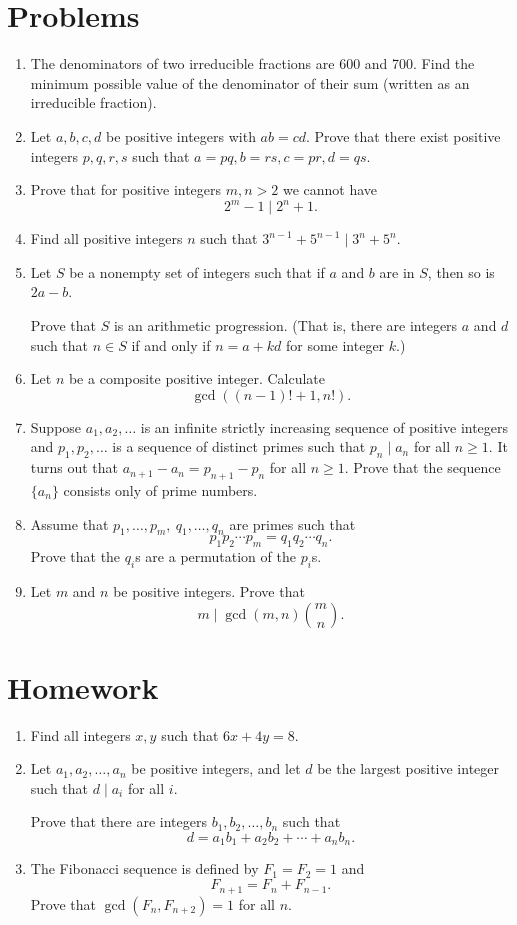 \documentclass{article}
\begin{document}
\section{Problems}
  \begin{enumerate}
    \item The denominators of two irreducible fractions are 600 and 700. Find the
      minimum possible value of the denominator of their sum (written as an irreducible
      fraction).
    \item Let $a,b,c,d$ be positive integers with $ab=cd$. Prove that there
      exist positive integers $p,q,r,s$ such that \(a=pq,b=rs,c=pr,d=qs\).
    \item Prove that for positive integers $m,n>2$ we cannot have \[2^m-1\mid
        2^n+1.\]
    \item Find all positive integers $n$ such that $3^{n-1}+5^{n-1}\mid
      3^n+5^n$.
    \item Let $S$ be a nonempty set of integers such that if $a$ and $b$ are in $S$, then
      so is $2a-b$.

      Prove that $S$ is an arithmetic
      progression. (That is, there are integers $a$ and $d$ such that $n\in S$ if
      and only if 
      $n=a+kd$ for some integer $k$.)
    \item Let $n$ be a composite positive integer. Calculate
      \[\gcd((n-1)!+1,n!).\]
    \item Suppose $a_1,a_2, \dots$ is an infinite strictly increasing sequence of
      positive integers and $p_1, p_2, \dots$ is a sequence of distinct primes
      such that $p_n \mid a_n$ for all $n \ge 1$. It turns out that
      $a_{n+1}-a_n=p_{n+1}-p_n$ for all $n\ge 1$. Prove that the sequence $\{a_n\}$
      consists only of prime numbers.
    \item Assume that $p_1,\ldots,p_m,\ q_1,\ldots,q_n$ are primes such that
      \[p_1p_2\cdots p_m=q_1q_2\cdots q_n.\]
      Prove that the $q_i$s are a permutation of the $p_i$s.
    \item Let $m$ and $n$ be positive integers. Prove that
      \[m\mid\gcd(m,n)\binom mn.\]
  \end{enumerate}
\newpage
\section{Homework}
  \begin{enumerate}
    \item Find all integers $x,y$ such that $6x+4y=8$.
    \item Let $a_1,a_2,\ldots,a_n$ be positive integers, and let $d$ be the
      largest positive integer such that $d\mid a_i$ for all $i$.

      Prove that there are integers $b_1,b_2,\ldots,b_n$ such that
      \[d=a_1b_1+a_2b_2+\cdots+a_n b_n.\]
    \item The Fibonacci sequence is defined by $F_1=F_2=1$ and
      \[F_{n+1}=F_n+F_{n-1}.\]
      Prove that $\gcd(F_n,F_{n+2})=1$ for all $n$.
  \end{enumerate}
\end{document}
